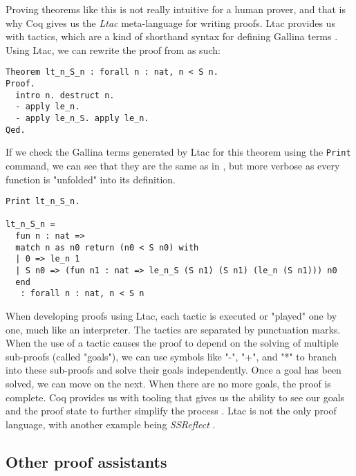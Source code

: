 Proving theorems like this is not really intuitive for a human prover,
and that is why Coq gives us the \emph{Ltac} meta-language for writing proofs.
Ltac provides us with tactics, which are a kind of shorthand syntax for defining Gallina terms \cite{cltac}.
Using Ltac, we can rewrite the proof from  as such:

\begin{minipage}{\linewidth}
\begin{lstlisting}[language=Coq, label={lst:ltac_ex}, caption={Example of Ltac syntax}]
Theorem lt_n_S_n : forall n : nat, n < S n.
Proof.
  intro n. destruct n.
  - apply le_n.
  - apply le_n_S. apply le_n.
Qed.
\end{lstlisting}
\end{minipage}

If we check the Gallina terms generated by Ltac for this theorem using the \lstinline{Print} command,
we can see that they are the same as in ,
but more verbose as every function is "unfolded" into its definition.

\begin{minipage}{\linewidth}
\begin{lstlisting}[language=Coq, label={lst:ltac_ex_printed}, caption={Gallina terms generated by Ltac example}]
Print lt_n_S_n.

lt_n_S_n =
  fun n : nat =>
  match n as n0 return (n0 < S n0) with
  | 0 => le_n 1
  | S n0 => (fun n1 : nat => le_n_S (S n1) (S n1) (le_n (S n1))) n0
  end
   : forall n : nat, n < S n
\end{lstlisting}
\end{minipage}

When developing proofs using Ltac, each tactic is executed or "played" one by one,
much like an interpreter. The tactics are separated by punctuation marks.
When the use of a tactic causes the proof to depend on the solving of multiple sub-proofs (called "goals"),
we can use symbols like "-", "+", and "*" to branch into these sub-proofs and solve their goals independently.
Once a goal has been solved, we can move on the next. When there are no more goals, the proof is complete.
Coq provides us with tooling that gives us the ability to see our goals and the proof state
to further simplify the process \cite{cide}.
Ltac is not the only proof language, with another example being \emph{SSReflect} \cite{cssr}.

\subsection{Other proof assistants}
\label{ssec:other_proof_assistants}

